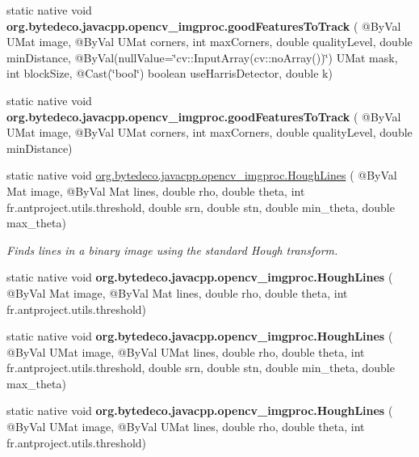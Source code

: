 \begin{DoxyCompactItemize}
static native void {\bfseries org.\+bytedeco.\+javacpp.\+opencv\+\_\+imgproc.\+good\+Features\+To\+Track} ( @By\+Val U\+Mat image, @By\+Val U\+Mat corners, int max\+Corners, double quality\+Level, double min\+Distance, @By\+Val(null\+Value=\char`\"{}cv\+::\+Input\+Array(cv\+::no\+Array())\char`\"{}) U\+Mat mask, int block\+Size, @Cast(\char`\"{}bool\char`\"{}) boolean use\+Harris\+Detector, double k)
\item 
\mbox{\label{group__imgproc__feature_ga5ef00a173eab10aa524cee009daf35fa}} 
static native void {\bfseries org.\+bytedeco.\+javacpp.\+opencv\+\_\+imgproc.\+good\+Features\+To\+Track} ( @By\+Val U\+Mat image, @By\+Val U\+Mat corners, int max\+Corners, double quality\+Level, double min\+Distance)
\item 
static native void \hyperlink{group__imgproc__feature_ga304555e089d6883caf9ac96ebef50718}{org.\+bytedeco.\+javacpp.\+opencv\+\_\+imgproc.\+Hough\+Lines} ( @By\+Val Mat image, @By\+Val Mat lines, double rho, double theta, int fr.antproject.utils.threshold, double srn, double stn, double min\+\_\+theta, double max\+\_\+theta)
\begin{DoxyCompactList}\small\item\em Finds lines in a binary image using the standard Hough transform. \end{DoxyCompactList}\item 
\mbox{\label{group__imgproc__feature_ga5e579ff99d29a922ebc5398e1b50d508}} 
static native void {\bfseries org.\+bytedeco.\+javacpp.\+opencv\+\_\+imgproc.\+Hough\+Lines} ( @By\+Val Mat image, @By\+Val Mat lines, double rho, double theta, int fr.antproject.utils.threshold)
\item 
\mbox{\label{group__imgproc__feature_gad5ec1da6fe31a01920f24db535e379f9}} 
static native void {\bfseries org.\+bytedeco.\+javacpp.\+opencv\+\_\+imgproc.\+Hough\+Lines} ( @By\+Val U\+Mat image, @By\+Val U\+Mat lines, double rho, double theta, int fr.antproject.utils.threshold, double srn, double stn, double min\+\_\+theta, double max\+\_\+theta)
\item 
\mbox{\label{group__imgproc__feature_ga190a7b3beae6372ac6fa6ae1f5324928}} 
static native void {\bfseries org.\+bytedeco.\+javacpp.\+opencv\+\_\+imgproc.\+Hough\+Lines} ( @By\+Val U\+Mat image, @By\+Val U\+Mat lines, double rho, double theta, int fr.antproject.utils.threshold)

\end{DoxyCompactItemize}
